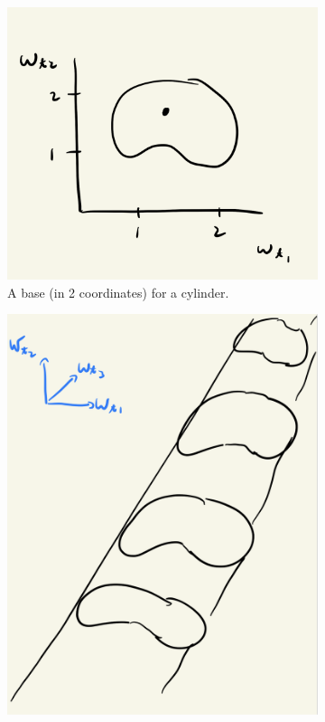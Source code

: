 \documentclass{article} %
\begin{document}
\begin{example}
\begin{figure}
     \centering
     \begin{subfigure}[b]{0.45\textwidth}
         \centering
\includegraphics[width=\textwidth]{images/cylinder_base_in_2_coordinates} 
         \caption{A base (in 2 coordinates) for a cylinder.}
\label{fig:cylinder_base_in_2_coordinates}
     \end{subfigure}
     \hfill
     \begin{subfigure}[b]{0.45\textwidth}
         \centering
         \includegraphics[width=\textwidth]{images/cylinder_projected_to_first_three_coordinates}

\end{subfigure}
\end{figure}
\end{example}
\end{document}
